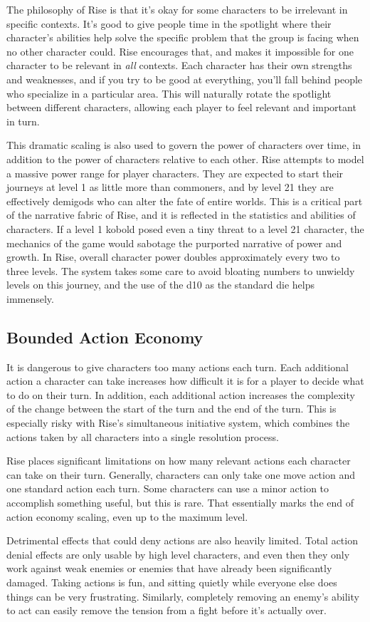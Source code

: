     The philosophy of Rise is that it's okay for some characters to be irrelevant in specific contexts.
    It's good to give people time in the spotlight where their character's abilities help solve the specific problem that the group is facing when no other character could.
    Rise encourages that, and makes it impossible for one character to be relevant in \textit{all} contexts.
    Each character has their own strengths and weaknesses, and if you try to be good at everything, you'll fall behind people who specialize in a particular area.
    This will naturally rotate the spotlight between different characters, allowing each player to feel relevant and important in turn.

    This dramatic scaling is also used to govern the power of characters over time, in addition to the power of characters relative to each other.
    Rise attempts to model a massive power range for player characters.
    They are expected to start their journeys at level 1 as little more than commoners, and by level 21 they are effectively demigods who can alter the fate of entire worlds.
    This is a critical part of the narrative fabric of Rise, and it is reflected in the statistics and abilities of characters.
    If a level 1 kobold posed even a tiny threat to a level 21 character, the mechanics of the game would sabotage the purported narrative of power and growth.
    In Rise, overall character power doubles approximately every two to three levels.
    The system takes some care to avoid bloating numbers to unwieldy levels on this journey, and the use of the d10 as the standard die helps immensely.

  \subsection{Bounded Action Economy}
    It is dangerous to give characters too many actions each turn.
    Each additional action a character can take increases how difficult it is for a player to decide what to do on their turn.
    In addition, each additional action increases the complexity of the change between the start of the turn and the end of the turn.
    This is especially risky with Rise's simultaneous initiative system, which combines the actions taken by all characters into a single resolution process.

    Rise places significant limitations on how many relevant actions each character can take on their turn.
    Generally, characters can only take one move action and one standard action each turn.
    Some characters can use a minor action to accomplish something useful, but this is rare.
    That essentially marks the end of action economy scaling, even up to the maximum level.

    Detrimental effects that could deny actions are also heavily limited.
    Total action denial effects are only usable by high level characters, and even then they only work against weak enemies or enemies that have already been significantly damaged.
    Taking actions is fun, and sitting quietly while everyone else does things can be very frustrating.
    Similarly, completely removing an enemy's ability to act can easily remove the tension from a fight before it's actually over.
